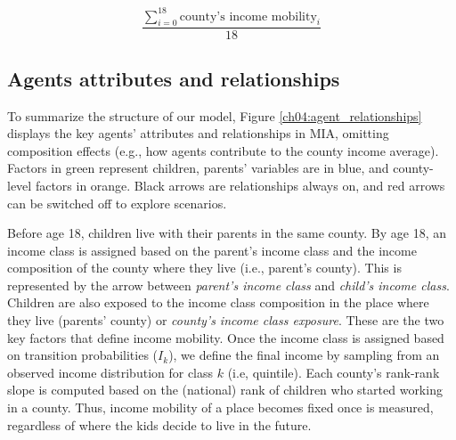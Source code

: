 \documentclass[class=article, crop=false, 12pt]{standalone}
\begin{document}
\vspace{-5pt}
\begin{equation}\label{ch04:eq_exp_income_mobility}
   \frac{\sum_{i=0}^{18} \text{county's income mobility}_i}{18}
\end{equation}

\subsection{Agents attributes and relationships}

To summarize the structure of our model, Figure \ref{ch04:agent_relationships} displays the key agents' attributes and relationships in MIA, omitting composition effects (e.g., how agents contribute to the county income average). Factors in green represent children, parents' variables are in blue, and  county-level factors in orange. Black arrows are relationships always on, and red arrows can be switched off to explore scenarios. 

Before age 18, children live with their parents in the same county. By age 18, an income class is assigned based on the parent's income class and the income composition of the county where they live (i.e., parent's county). 
This is represented by the arrow between \emph{parent's income class} and \emph{child's income class}. Children are also exposed to the income class composition in the place where they live (parents' county) or \emph{county's income class exposure}.
These are the two key factors that define income mobility. Once the income class is assigned based on transition probabilities ($I_k$), we define  the final income by sampling from an observed income distribution for class $k$ (i.e, quintile). Each county's rank-rank slope is computed based on the (national) rank of children who started working in a county. Thus, income mobility of a place becomes fixed once is measured, regardless of where the kids decide to live in the future. 
\end{document}

